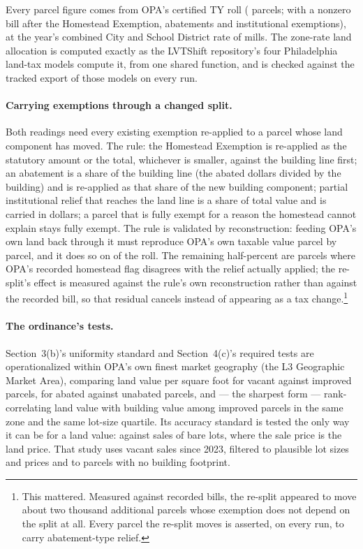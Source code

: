 \documentclass[11pt]{article}
\begin{document}
Every parcel figure comes from OPA's certified TY\LycdTaxYear{} roll (\LycdParcels{} parcels;
\LycdBilledParcels{} with a nonzero bill after the Homestead Exemption, abatements and
institutional exemptions), at the year's combined City and School District rate of
\LycdMillage{} mills. The zone-rate land allocation is computed exactly as the LVTShift
repository's four Philadelphia land-tax models compute it, from one shared function, and is
checked against the tracked export of those models on every run.

\paragraph{Carrying exemptions through a changed split.} Both readings need every existing
exemption re-applied to a parcel whose land component has moved. The rule: the Homestead
Exemption is re-applied as the statutory amount or the total, whichever is smaller, against
the building line first; an abatement is a share of the building line (the abated dollars
divided by the building) and is re-applied as that share of the new building component; partial
institutional relief that reaches the land line is a share of total value and is carried in
dollars; a parcel that is fully exempt for a reason the homestead cannot explain stays fully
exempt. The rule is validated by reconstruction: feeding OPA's own land back through it must
reproduce OPA's own taxable value parcel by parcel, and it does so on \LycdReconMatchPct{} of the roll. The
remaining half-percent are parcels where OPA's recorded homestead flag disagrees with the
relief actually applied; the re-split's effect is measured against the rule's own
reconstruction rather than against the recorded bill, so that residual cancels instead of
appearing as a tax change.\footnote{This mattered. Measured against recorded bills, the
re-split appeared to move about two thousand additional parcels whose exemption does not
depend on the split at all. Every parcel the re-split moves is asserted, on every run, to carry
abatement-type relief.}

\paragraph{The ordinance's tests.} Section~3(b)'s uniformity standard and Section~4(c)'s
required tests are operationalized within OPA's own finest market geography (the L3 Geographic
Market Area), comparing land value per square foot for vacant against improved parcels, for
abated against unabated parcels, and --- the sharpest form --- rank-correlating land value with
building value among improved parcels in the same zone and the same lot-size quartile. Its
accuracy standard is tested the only way it can be for a land value: against sales of bare
lots, where the sale price is the land price. That study uses \LycdSalesN{} vacant sales since
2023, filtered to plausible lot sizes and prices and to parcels with no building footprint.
\end{document}
